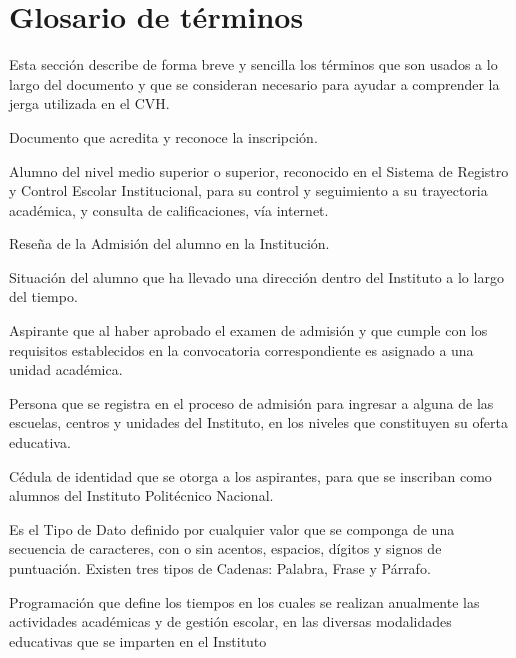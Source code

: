 \section{Glosario de términos}

	Esta sección describe de forma breve y sencilla los términos que son usados a lo largo del documento y que se consideran necesario para ayudar a comprender la jerga utilizada en el  CVH.


	
\begin{bGlosario}
	
	 Documento que acredita y reconoce la inscripción. %
	
	 Alumno del nivel medio superior o superior, reconocido en el Sistema de Registro y Control Escolar Institucional, para su control y seguimiento a su trayectoria académica, y consulta de calificaciones, vía internet. %
	
	 Reseña de la Admisión del alumno en la Institución. %
	
	 Situación del alumno que ha llevado una dirección dentro del Instituto a lo largo del tiempo. %
		
	 Aspirante que al haber aprobado el examen de admisión y que cumple con los requisitos establecidos en la convocatoria correspondiente es asignado a una unidad académica. %
	
	
	Persona que se registra en el proceso de admisión para ingresar a alguna de las escuelas, centros y unidades del Instituto, en los niveles que constituyen su oferta educativa. %
	
	Cédula de identidad que se otorga a los aspirantes, para que se inscriban como alumnos del Instituto Politécnico Nacional. %
	
	 Es el Tipo de Dato definido por cualquier valor que se componga de una secuencia de caracteres, con o sin acentos, espacios, dígitos y signos de puntuación. Existen tres tipos de Cadenas: Palabra, Frase y Párrafo.
	
	 Programación que define los tiempos en los cuales se realizan anualmente las actividades académicas y de gestión escolar, en las diversas modalidades educativas que se imparten en el Instituto 
	

\end{bGlosario}
